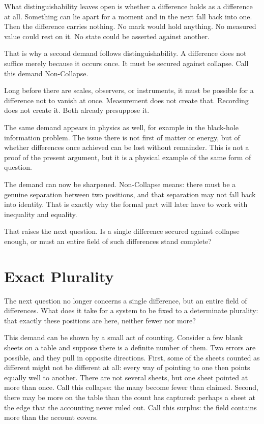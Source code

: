 \documentclass[11pt,a4paper]{book}
\begin{document}
What distinguishability leaves open is whether a difference holds as a
difference at all. Something can lie apart for a moment and in the next
fall back into one. Then the difference carries nothing. No mark would hold
anything. No measured value could rest on it. No state could be asserted
against another.

That is why a second demand follows distinguishability. A difference does
not suffice merely because it occurs once. It must be secured against
collapse. Call this demand Non-Collapse.

Long before there are scales, observers, or instruments, it must be
possible for a difference not to vanish at once. Measurement does not
create that. Recording does not create it. Both already presuppose it.

The same demand appears in physics as well, for example in the black-hole
information problem. The issue there is not first of matter or energy, but
of whether differences once achieved can be lost without remainder. This is
not a proof of the present argument, but it is a physical example of the
same form of question.

The demand can now be sharpened. Non-Collapse means: there must be a genuine
separation between two positions, and that separation may not fall back into
identity. That is exactly why the formal part will later have to work with
inequality and equality.

That raises the next question. Is a single difference secured against
collapse enough, or must an entire field of such differences stand complete?

\section{Exact Plurality}
\label{ch:plurality}

The next question no longer concerns a single difference, but an entire
field of differences. What does it take for a system to be fixed to a
determinate plurality: that exactly these positions are here, neither fewer
nor more?

This demand can be shown by a small act of counting. Consider a few blank
sheets on a table and suppose there is a definite number of them. Two errors
are possible, and they pull in opposite directions. First, some of the sheets
counted as different might not be different at all: every way of pointing to
one then points equally well to another. There are not several sheets, but
one sheet pointed at more than once. Call this collapse: the many become
fewer than claimed. Second, there may be more on the table than the count
has captured: perhaps a sheet at the edge that the accounting never ruled
out. Call this surplus: the field contains more than the account covers.
\end{document}
